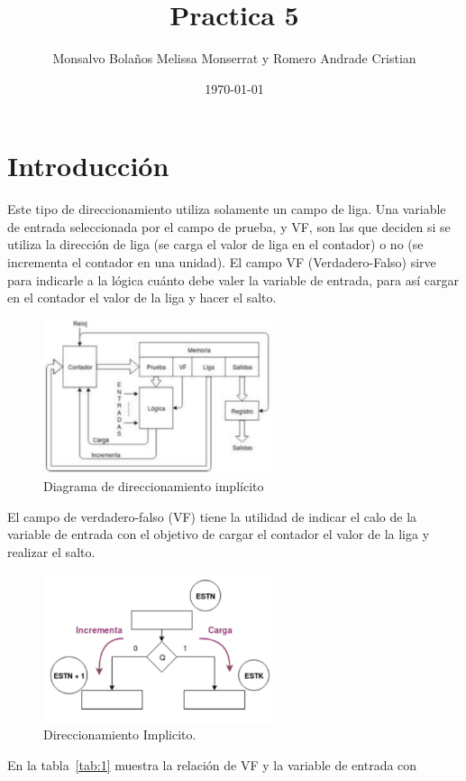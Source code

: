 \documentclass[table]{scrartcl}
\author{Monsalvo Bolaños Melissa Monserrat y Romero Andrade Cristian}
\date{\today}
\title{Practica 5}
\begin{document}

\section{Introducción}
Este tipo de direccionamiento utiliza solamente un campo de liga. Una variable
de entrada seleccionada por el campo de prueba, y VF, son las que deciden si se
utiliza la dirección de liga (se carga el valor de liga en el contador) o no (se
incrementa el contador en una unidad). El campo VF (Verdadero-Falso) sirve para
indicarle a la lógica cuánto debe valer la variable de entrada, para así cargar
en el contador el valor de la liga y hacer el salto.
\begin{figure}[htbp]
  \centering
  \includegraphics[width=0.6\textwidth]{./img/1.png}
  \caption{Diagrama de direccionamiento implícito}\label{fig:1}
\end{figure}
El campo de verdadero-falso (VF) tiene la utilidad de indicar el calo de la
variable de entrada con el objetivo de cargar el contador el valor de la liga y
realizar el salto.
\begin{figure}[htbp]
  \centering
  \includegraphics[width=0.6\textwidth]{./img/2.png}
  \caption{Direccionamiento Implicito.}\label{fig:2}
\end{figure}
En la tabla~\ref{tab:1}  muestra la relación de VF y la variable de entrada con
\end{document}
